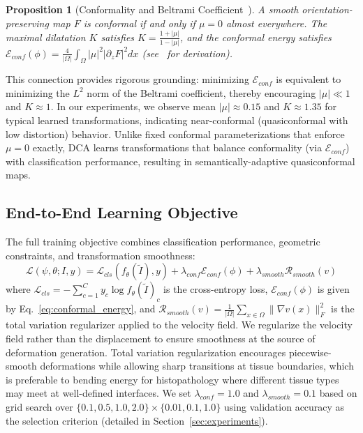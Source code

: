 \documentclass[10pt,journal,compsoc]{IEEEtran}
\newtheorem{proposition}{Proposition}
\begin{document}
\begin{proposition}[Conformality and Beltrami Coefficient~\cite{ahlfors2006conformal}]
\label{prop:beltrami}
A smooth orientation-preserving map $F$ is conformal if and only if $\mu = 0$ almost everywhere. The maximal dilatation $K$ satisfies $K = \frac{1 + |\mu|}{1 - |\mu|}$, and the conformal energy satisfies $\mathcal{E}_{conf}(\phi) = \frac{4}{|\Omega|} \int_\Omega |\mu|^2 | \partial_z F |^2 dx$ (see~\cite{lui2014brain} for derivation).
\end{proposition}

This connection provides rigorous grounding: minimizing $\mathcal{E}_{conf}$ is equivalent to minimizing the $L^2$ norm of the Beltrami coefficient, thereby encouraging $|\mu| \ll 1$ and $K \approx 1$. In our experiments, we observe mean $|\mu| \approx 0.15$ and $K \approx 1.35$ for typical learned transformations, indicating near-conformal (quasiconformal with low distortion) behavior. Unlike fixed conformal parameterizations that enforce $\mu = 0$ exactly, DCA learns transformations that balance conformality (via $\mathcal{E}_{conf}$) with classification performance, resulting in semantically-adaptive quasiconformal maps.

\subsection{End-to-End Learning Objective}

The full training objective combines classification performance, geometric constraints, and transformation smoothness:
\begin{equation}
\mathcal{L}(\psi, \theta; I, y) = \mathcal{L}_{cls}(f_\theta(\tilde{I}), y) + \lambda_{conf} \mathcal{E}_{conf}(\phi) + \lambda_{smooth} \mathcal{R}_{smooth}(v)
\label{eq:full_loss}
\end{equation}
where $\mathcal{L}_{cls} = -\sum_{c=1}^C y_c \log f_\theta(\tilde{I})_c$ is the cross-entropy loss, $\mathcal{E}_{conf}(\phi)$ is given by Eq.~\eqref{eq:conformal_energy}, and $\mathcal{R}_{smooth}(v) = \frac{1}{|\Omega|} \sum_{x \in \Omega} \|\nabla v(x)\|_F^2$ is the total variation regularizer applied to the velocity field. We regularize the velocity field rather than the displacement to ensure smoothness at the source of deformation generation. Total variation regularization encourages piecewise-smooth deformations while allowing sharp transitions at tissue boundaries, which is preferable to bending energy for histopathology where different tissue types may meet at well-defined interfaces. We set $\lambda_{conf} = 1.0$ and $\lambda_{smooth} = 0.1$ based on grid search over $\{0.1, 0.5, 1.0, 2.0\} \times \{0.01, 0.1, 1.0\}$ using validation accuracy as the selection criterion (detailed in Section~\ref{sec:experiments}).
\end{document}
